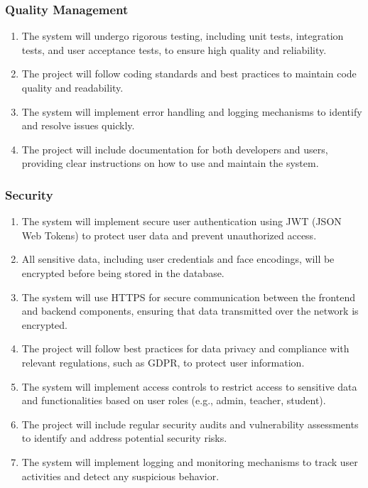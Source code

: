 \documentclass[openany]{report}
\begin{document}
\subsubsection{Quality Management}
\begin{enumerate}
    \item The system will undergo rigorous testing, including unit tests, integration tests, and user acceptance tests, to ensure high quality and reliability.
    \item The project will follow coding standards and best practices to maintain code quality and readability.
    \item The system will implement error handling and logging mechanisms to identify and resolve issues quickly.
    \item The project will include documentation for both developers and users, providing clear instructions on how to use and maintain the system.
\end{enumerate}
\subsubsection{Security}

\begin{enumerate}
    \item The system will implement secure user authentication using JWT (JSON Web Tokens) to protect user data and prevent unauthorized access.
    \item All sensitive data, including user credentials and face encodings, will be encrypted before being stored in the database.
    \item The system will use HTTPS for secure communication between the frontend and backend components, ensuring that data transmitted over the network is encrypted.
    \item The project will follow best practices for data privacy and compliance with relevant regulations, such as GDPR, to protect user information.
    \item The system will implement access controls to restrict access to sensitive data and functionalities based on user roles (e.g., admin, teacher, student).
    \item The project will include regular security audits and vulnerability assessments to identify and address potential security risks.
    \item The system will implement logging and monitoring mechanisms to track user activities and detect any suspicious behavior.
\end{enumerate}
\end{document}
